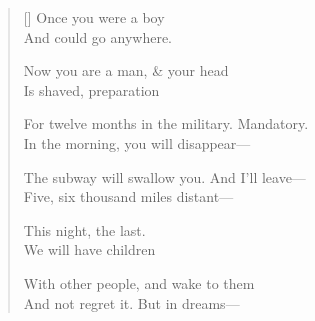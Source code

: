 \label{ch:milano_last_day}
\settowidth{\versewidth}{For twelve months in the military.   Mandatory.}
\begin{verse}[\versewidth]
Once you were a boy\\
And could go anywhere.

Now you are a man, \& your head\\
Is shaved, preparation

For twelve months in the military.   Mandatory.\\
In the morning, you will disappear---

The subway will swallow you.   And I'll leave---\\
Five, six thousand miles distant---

This night, the last.\\
We will have children

With other people, and wake to them\\
And not regret it.     But in dreams---
\end{verse}
